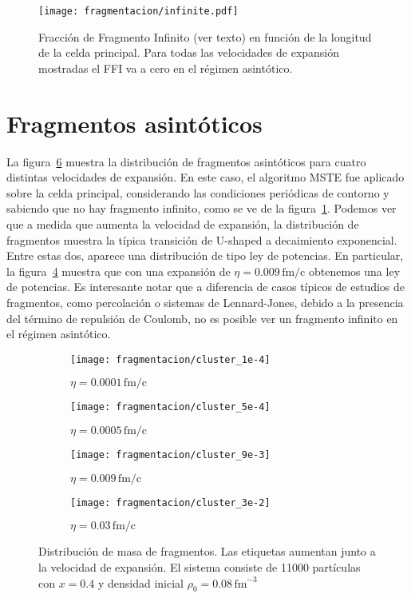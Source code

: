\begin{figure}
  \centering
  \texttt{[image: fragmentacion/infinite.pdf]}
  \caption{Fracción de Fragmento Infinito (ver texto) en función de la longitud de la celda principal.
    Para todas las velocidades de expansión mostradas el FFI va a cero en el régimen asintótico.}
  \label{fig:infinite}
\end{figure}

\section{Fragmentos asintóticos}

La figura~\ref{fig:distribution} muestra la distribución de fragmentos asintóticos para cuatro distintas velocidades de expansión.
En este caso, el algoritmo MSTE fue aplicado sobre la celda principal, considerando las condiciones periódicas de contorno y sabiendo que no hay fragmento infinito, como se ve de la figura~\ref{fig:infinite}.
Podemos ver que a medida que aumenta la velocidad de expansión, la distribución de fragmentos muestra la típica transición de U-shaped a decaimiento exponencial.
Entre estas dos, aparece una distribución de tipo ley de potencias.
En particular, la figura~\ref{subfig:9e-3} muestra que con una expansión de $\eta = 0.009\,\text{fm/c}$ obtenemos una ley de potencias.
Es interesante notar que a diferencia de casos típicos de estudios de fragmentos, como percolación o sistemas de Lennard-Jones, debido a la presencia del término de repulsión de Coulomb, no es posible ver un fragmento infinito en el régimen asintótico.

\begin{figure} \centering
  \begin{subfigure}[h!]{0.45\columnwidth}
    \texttt{[image: fragmentacion/cluster\_1e-4]}
    \caption{$\eta = 0.0001\,\text{fm/c}$}
    \label{subfig:1e-4}
  \end{subfigure}
  \begin{subfigure}[h!]{0.45\columnwidth}
    \texttt{[image: fragmentacion/cluster\_5e-4]}
    \caption{$\eta = 0.0005\,\text{fm/c}$}
    \label{subfig:5e-4}
  \end{subfigure}
  \begin{subfigure}[h!]{0.45\columnwidth}
    \texttt{[image: fragmentacion/cluster\_9e-3]}
    \caption{$\eta = 0.009\,\text{fm/c}$}
    \label{subfig:9e-3}
  \end{subfigure}
  \begin{subfigure}[h!]{0.45\columnwidth}
    \texttt{[image: fragmentacion/cluster\_3e-2]}
    \caption{$\eta = 0.03\,\text{fm/c}$}
    \label{subfig:3e-2}
  \end{subfigure}
  \caption{Distribución de masa de fragmentos.
    Las etiquetas aumentan junto a la velocidad de expansión.
    El sistema consiste de 11000 partículas con $x=0.4$ y densidad inicial $\rho_0 = 0.08\,\text{fm}^{-3}$}
  \label{fig:distribution}
\end{figure}

